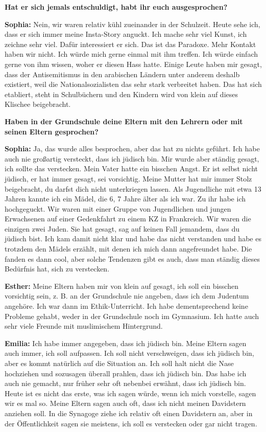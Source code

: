 \textbf{Hat er sich jemals entschuldigt, habt ihr euch ausgesprochen?}

\textbf{Sophia:} Nein, wir waren relativ kühl zueinander in der Schulzeit. Heute sehe ich, dass er sich immer meine Insta-Story anguckt. Ich mache sehr viel Kunst, ich zeichne sehr viel. Dafür interessiert er sich. Das ist das Paradoxe. Mehr Kontakt haben wir nicht. Ich würde mich gerne einmal mit ihm treffen. Ich würde einfach gerne von ihm wissen, woher er diesen Hass hatte. Einige Leute haben mir gesagt, dass der Antisemitismus in den arabischen Ländern unter anderem deshalb existiert, weil die Nationalsozialisten das sehr stark verbreitet haben. Das hat sich etabliert, steht in Schulbüchern und den Kindern wird von klein auf dieses Klischee beigebracht.   

\textbf{Haben in der Grundschule deine Eltern mit den Lehrern oder mit seinen Eltern gesprochen?}   

\textbf{Sophia:} Ja, das wurde alles besprochen, aber das hat zu nichts geführt. Ich habe auch nie großartig versteckt, dass ich jüdisch bin. Mir wurde aber ständig gesagt, ich sollte das verstecken. Mein Vater hatte ein bisschen Angst. Er ist selbst nicht jüdisch, er hat immer gesagt, sei vorsichtig. Meine Mutter hat mir immer Stolz beigebracht, du darfst dich nicht unterkriegen lassen. Als Jugendliche mit etwa 13 Jahren kannte ich ein Mädel, die 6, 7 Jahre älter als ich war. Zu ihr habe ich hochgeguckt. Wir waren mit einer Gruppe von Jugendlichen und jungen Erwachsenen auf einer Gedenkfahrt zu einem KZ in Frankreich. Wir waren die einzigen zwei Juden. Sie hat gesagt, sag auf keinen Fall jemandem, dass du jüdisch bist. Ich kam damit nicht klar und habe das nicht verstanden und habe es trotzdem den Mädels erzählt, mit denen ich mich dann angefreundet habe. Die fanden es dann cool, aber solche Tendenzen gibt es auch, dass man ständig dieses Bedürfnis hat, sich zu verstecken.  

\textbf{Esther:} Meine Eltern haben mir von klein auf gesagt, ich soll ein bisschen vorsichtig sein, z. B. an der Grundschule nie angeben, dass ich dem Judentum angehöre. Ich war dann im Ethik-Unterricht. Ich habe dementsprechend keine Probleme gehabt, weder in der Grundschule noch im Gymnasium. Ich hatte auch sehr viele Freunde mit muslimischem Hintergrund. 

\textbf{Emilia:} Ich habe immer angegeben, dass ich jüdisch bin. Meine Eltern sagen auch immer, ich soll aufpassen. Ich soll nicht verschweigen, dass ich jüdisch bin, aber es kommt natürlich auf die Situation an. Ich soll halt nicht die Nase hochziehen und sozusagen überall prahlen, dass ich jüdisch bin. Das habe ich auch nie gemacht, nur früher sehr oft nebenbei erwähnt, dass ich jüdisch bin. Heute ist es nicht das erste, was ich sagen würde, wenn ich mich vorstelle, sagen wir es mal so. Meine Eltern sagen auch oft, dass ich nicht meinen Davidstern anziehen soll. In die Synagoge ziehe ich relativ oft einen Davidstern an, aber in der Öffentlichkeit sagen sie meistens, ich soll es verstecken oder gar nicht tragen.  

